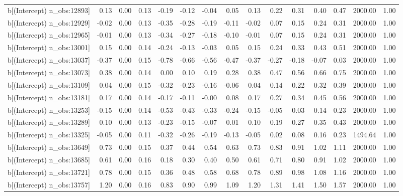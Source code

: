 \begin{table}[ht]
\begin{tabular}{rrrrrrrrrrrrrrr}
  b[(Intercept) n\_obs:12893] & 0.13 & 0.00 & 0.13 & -0.19 & -0.12 & -0.04 & 0.05 & 0.13 & 0.22 & 0.31 & 0.40 & 0.47 & 2000.00 & 1.00 \\ 
  b[(Intercept) n\_obs:12929] & -0.02 & 0.00 & 0.13 & -0.35 & -0.28 & -0.19 & -0.11 & -0.02 & 0.07 & 0.15 & 0.24 & 0.31 & 2000.00 & 1.00 \\ 
  b[(Intercept) n\_obs:12965] & -0.01 & 0.00 & 0.13 & -0.34 & -0.27 & -0.18 & -0.10 & -0.01 & 0.07 & 0.15 & 0.24 & 0.31 & 2000.00 & 1.00 \\ 
  b[(Intercept) n\_obs:13001] & 0.15 & 0.00 & 0.14 & -0.24 & -0.13 & -0.03 & 0.05 & 0.15 & 0.24 & 0.33 & 0.43 & 0.51 & 2000.00 & 1.00 \\ 
  b[(Intercept) n\_obs:13037] & -0.37 & 0.00 & 0.15 & -0.78 & -0.66 & -0.56 & -0.47 & -0.37 & -0.27 & -0.18 & -0.07 & 0.03 & 2000.00 & 1.00 \\ 
  b[(Intercept) n\_obs:13073] & 0.38 & 0.00 & 0.14 & 0.00 & 0.10 & 0.19 & 0.28 & 0.38 & 0.47 & 0.56 & 0.66 & 0.75 & 2000.00 & 1.00 \\ 
  b[(Intercept) n\_obs:13109] & 0.04 & 0.00 & 0.15 & -0.32 & -0.23 & -0.16 & -0.06 & 0.04 & 0.14 & 0.22 & 0.32 & 0.39 & 2000.00 & 1.00 \\ 
  b[(Intercept) n\_obs:13181] & 0.17 & 0.00 & 0.14 & -0.17 & -0.11 & -0.00 & 0.08 & 0.17 & 0.27 & 0.34 & 0.45 & 0.56 & 2000.00 & 1.00 \\ 
  b[(Intercept) n\_obs:13253] & -0.15 & 0.00 & 0.14 & -0.53 & -0.43 & -0.33 & -0.24 & -0.15 & -0.05 & 0.03 & 0.14 & 0.23 & 2000.00 & 1.00 \\ 
  b[(Intercept) n\_obs:13289] & 0.10 & 0.00 & 0.13 & -0.23 & -0.15 & -0.07 & 0.01 & 0.10 & 0.19 & 0.27 & 0.35 & 0.43 & 2000.00 & 1.00 \\ 
  b[(Intercept) n\_obs:13325] & -0.05 & 0.00 & 0.11 & -0.32 & -0.26 & -0.19 & -0.13 & -0.05 & 0.02 & 0.08 & 0.16 & 0.23 & 1494.64 & 1.00 \\ 
  b[(Intercept) n\_obs:13649] & 0.73 & 0.00 & 0.15 & 0.37 & 0.44 & 0.54 & 0.63 & 0.73 & 0.83 & 0.91 & 1.02 & 1.11 & 2000.00 & 1.00 \\ 
  b[(Intercept) n\_obs:13685] & 0.61 & 0.00 & 0.16 & 0.18 & 0.30 & 0.40 & 0.50 & 0.61 & 0.71 & 0.80 & 0.91 & 1.02 & 2000.00 & 1.00 \\ 
  b[(Intercept) n\_obs:13721] & 0.78 & 0.00 & 0.15 & 0.36 & 0.48 & 0.58 & 0.68 & 0.78 & 0.89 & 0.98 & 1.08 & 1.16 & 2000.00 & 1.00 \\ 
  b[(Intercept) n\_obs:13757] & 1.20 & 0.00 & 0.16 & 0.83 & 0.90 & 0.99 & 1.09 & 1.20 & 1.31 & 1.41 & 1.50 & 1.57 & 2000.00 & 1.00 \\ 

\end{tabular}
\end{table}

